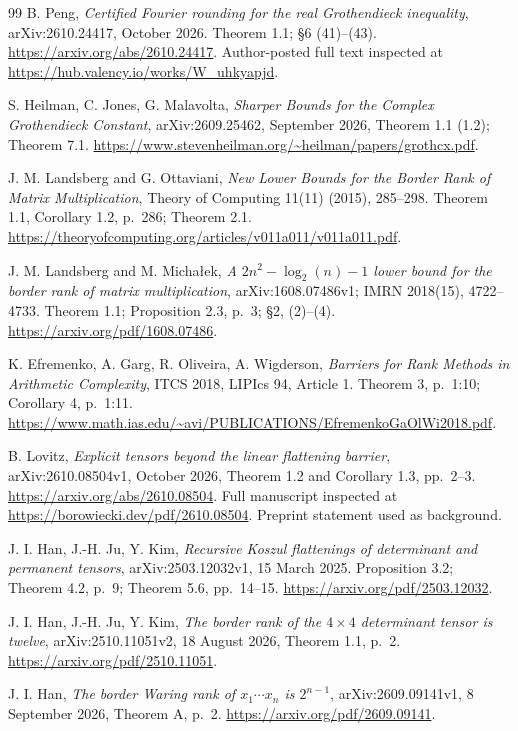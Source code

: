 \documentclass[11pt]{article}
\begin{document}
\begin{thebibliography}{99}
B. Peng, \emph{Certified Fourier rounding for the real
Grothendieck inequality}, arXiv:2610.24417, October 2026.
Theorem 1.1; \S6 (41)--(43).
\url{https://arxiv.org/abs/2610.24417}.
Author-posted full text inspected at
\url{https://hub.valency.io/works/W_uhkyapjd}.

S. Heilman, C. Jones, G. Malavolta,
\emph{Sharper Bounds for the Complex Grothendieck Constant},
arXiv:2609.25462, September 2026, Theorem 1.1 (1.2);
Theorem 7.1.
\url{https://www.stevenheilman.org/~heilman/papers/grothcx.pdf}.

J. M. Landsberg and G. Ottaviani,
\emph{New Lower Bounds for the Border Rank of Matrix Multiplication},
Theory of Computing 11(11) (2015), 285--298.
Theorem 1.1, Corollary 1.2, p.~286; Theorem 2.1.
\url{https://theoryofcomputing.org/articles/v011a011/v011a011.pdf}.

J. M. Landsberg and M. Micha{\l}ek,
\emph{A $2n^2-\log_2(n)-1$ lower bound for the border rank
of matrix multiplication}, arXiv:1608.07486v1;
IMRN 2018(15), 4722--4733.
Theorem 1.1; Proposition 2.3, p.~3; \S2, (2)--(4).
\url{https://arxiv.org/pdf/1608.07486}.

K. Efremenko, A. Garg, R. Oliveira, A. Wigderson,
\emph{Barriers for Rank Methods in Arithmetic Complexity},
ITCS 2018, LIPIcs 94, Article 1.
Theorem 3, p.~1:10; Corollary 4, p.~1:11.
\url{https://www.math.ias.edu/~avi/PUBLICATIONS/EfremenkoGaOlWi2018.pdf}.

B. Lovitz, \emph{Explicit tensors beyond the linear flattening barrier},
arXiv:2610.08504v1, October 2026, Theorem 1.2 and
Corollary 1.3, pp.~2--3.
\url{https://arxiv.org/abs/2610.08504}.
Full manuscript inspected at \url{https://borowiecki.dev/pdf/2610.08504}.
Preprint statement used as background.

J. I. Han, J.-H. Ju, Y. Kim,
\emph{Recursive Koszul flattenings of determinant and permanent tensors},
arXiv:2503.12032v1, 15 March 2025.
Proposition 3.2; Theorem 4.2, p.~9; Theorem 5.6, pp.~14--15.
\url{https://arxiv.org/pdf/2503.12032}.

J. I. Han, J.-H. Ju, Y. Kim,
\emph{The border rank of the $4\times4$ determinant tensor is twelve},
arXiv:2510.11051v2, 18 August 2026, Theorem 1.1, p.~2.
\url{https://arxiv.org/pdf/2510.11051}.

J. I. Han, \emph{The border Waring rank of $x_1\cdots x_n$
is $2^{n-1}$}, arXiv:2609.09141v1, 8 September 2026,
Theorem A, p.~2.
\url{https://arxiv.org/pdf/2609.09141}.


\end{thebibliography}
\end{document}
